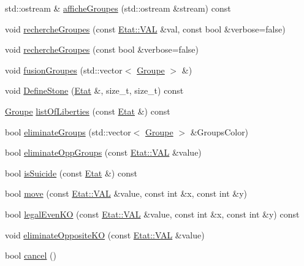\begin{DoxyCompactItemize}
\item 
std\+::ostream \& \hyperlink{class_goban_a8d5df6cd74b0240f36a4056f045625b7}{affiche\+Groupes} (std\+::ostream \&stream) const
\item 
void \hyperlink{class_goban_a8584a53688e7bcf9de7c4cf48454acdc}{recherche\+Groupes} (const \hyperlink{class_etat_af3ddb2296ffc379b7f3ad2bf832f294e}{Etat\+::\+V\+AL} \&val, const bool \&verbose=false)
\item 
void \hyperlink{class_goban_abd6663ff5c440bf6def073db02df83f0}{recherche\+Groupes} (const bool \&verbose=false)
\item 
void \hyperlink{class_goban_abc771312b6931c4217285ee1b306e51b}{fusion\+Groupes} (std\+::vector$<$ \hyperlink{class_groupe}{Groupe} $>$ \&)
\item 
void \hyperlink{class_goban_a0e2596110cdbb9b007b2b2fd8d5a9973}{Define\+Stone} (\hyperlink{class_etat}{Etat} \&, size\+\_\+t, size\+\_\+t) const
\item 
\hyperlink{class_groupe}{Groupe} \hyperlink{class_goban_a84f36324eb9ddc29f522d481f04c13e7}{list\+Of\+Liberties} (const \hyperlink{class_etat}{Etat} \&) const
\item 
bool \hyperlink{class_goban_a1ec70508987f66afff5f8df381731fac}{eliminate\+Groups} (std\+::vector$<$ \hyperlink{class_groupe}{Groupe} $>$ \&Groups\+Color)
\item 
bool \hyperlink{class_goban_a7858b815885e4af36f05f9d26182cb07}{eliminate\+Opp\+Groups} (const \hyperlink{class_etat_af3ddb2296ffc379b7f3ad2bf832f294e}{Etat\+::\+V\+AL} \&value)
\item 
bool \hyperlink{class_goban_a8b95ea2b51c078381562e361ff7febac}{is\+Suicide} (const \hyperlink{class_etat}{Etat} \&) const
\item 
bool \hyperlink{class_goban_a7dd1a7b53322bde2a831a923059e43a3}{move} (const \hyperlink{class_etat_af3ddb2296ffc379b7f3ad2bf832f294e}{Etat\+::\+V\+AL} \&value, const int \&x, const int \&y)
\item 
bool \hyperlink{class_goban_a799390f04139eec16f7bb8c79b381303}{legal\+Even\+KO} (const \hyperlink{class_etat_af3ddb2296ffc379b7f3ad2bf832f294e}{Etat\+::\+V\+AL} \&value, const int \&x, const int \&y) const
\item 
void \hyperlink{class_goban_a6c4b62a9469b3876d250ab94bcd562e5}{eliminate\+Opposite\+KO} (const \hyperlink{class_etat_af3ddb2296ffc379b7f3ad2bf832f294e}{Etat\+::\+V\+AL} \&value)
\item 
bool \hyperlink{class_goban_ae7ee3b39f3c0d28c9bca286ca538f8ac}{cancel} ()
\item 

\end{DoxyCompactItemize}
